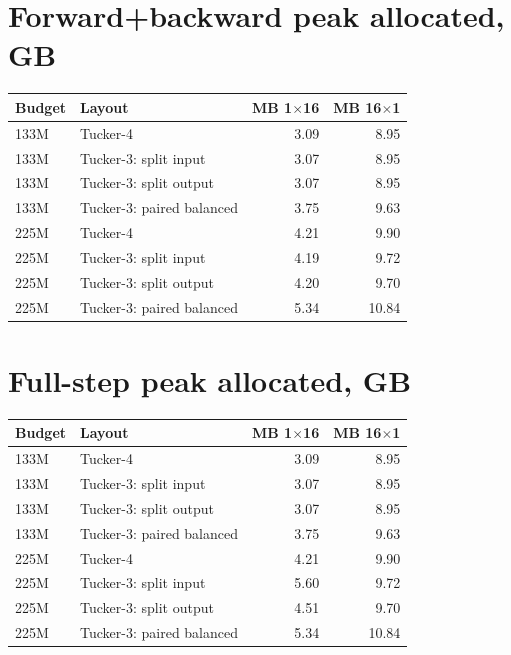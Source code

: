 \documentclass[10pt]{article}
\begin{document}
\section{Forward+backward peak allocated, GB}
\begin{center}
\small
\begin{tabular}{llrr}
\toprule
\textbf{Budget} & \textbf{Layout} & \textbf{MB 1$\times$16} & \textbf{MB 16$\times$1} \\
\midrule
133M & Tucker-4 & 3.09 & 8.95 \\
133M & Tucker-3: split input & 3.07 & 8.95 \\
133M & Tucker-3: split output & 3.07 & 8.95 \\
133M & Tucker-3: paired balanced & 3.75 & 9.63 \\
225M & Tucker-4 & 4.21 & 9.90 \\
225M & Tucker-3: split input & 4.19 & 9.72 \\
225M & Tucker-3: split output & 4.20 & 9.70 \\
225M & Tucker-3: paired balanced & 5.34 & 10.84 \\
\bottomrule
\end{tabular}
\end{center}
\section{Full-step peak allocated, GB}
\begin{center}
\small
\begin{tabular}{llrr}
\toprule
\textbf{Budget} & \textbf{Layout} & \textbf{MB 1$\times$16} & \textbf{MB 16$\times$1} \\
\midrule
133M & Tucker-4 & 3.09 & 8.95 \\
133M & Tucker-3: split input & 3.07 & 8.95 \\
133M & Tucker-3: split output & 3.07 & 8.95 \\
133M & Tucker-3: paired balanced & 3.75 & 9.63 \\
225M & Tucker-4 & 4.21 & 9.90 \\
225M & Tucker-3: split input & 5.60 & 9.72 \\
225M & Tucker-3: split output & 4.51 & 9.70 \\
225M & Tucker-3: paired balanced & 5.34 & 10.84 \\
\bottomrule
\end{tabular}
\end{center}
\end{document}

